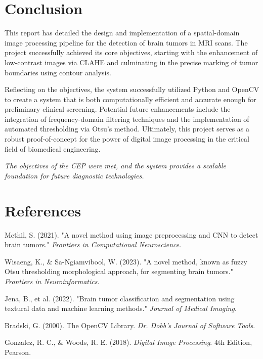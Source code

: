 \documentclass[12pt,a4paper,oneside]{report}
\begin{document}
\lipsum[5-6] %

\chapter{Conclusion}
This report has detailed the design and implementation of a spatial-domain image processing pipeline for the detection of brain tumors in MRI scans. The project successfully achieved its core objectives, starting with the enhancement of low-contrast images via CLAHE and culminating in the precise marking of tumor boundaries using contour analysis.

Reflecting on the objectives, the system successfully utilized Python and OpenCV to create a system that is both computationally efficient and accurate enough for preliminary clinical screening. Potential future enhancements include the integration of frequency-domain filtering techniques and the implementation of automated thresholding via Otsu's method. Ultimately, this project serves as a robust proof-of-concept for the power of digital image processing in the critical field of biomedical engineering.

\vfill
\textit{The objectives of the CEP were met, and the system provides a scalable foundation for future diagnostic technologies.}

\chapter{References}
\begin{enumerate}[label={[\arabic*]}]
    \item Methil, S. (2021). "A novel method using image preprocessing and CNN to detect brain tumors." \textit{Frontiers in Computational Neuroscience}.
    \item Wisaeng, K., \& Sa-Ngiamvibool, W. (2023). "A novel method, known as fuzzy Otsu thresholding morphological approach, for segmenting brain tumors." \textit{Frontiers in Neuroinformatics}.
    \item Jena, B., et al. (2022). "Brain tumor classification and segmentation using textural data and machine learning methods." \textit{Journal of Medical Imaging}.
    \item Bradski, G. (2000). The OpenCV Library. \textit{Dr. Dobb's Journal of Software Tools}.
    \item Gonzalez, R. C., & Woods, R. E. (2018). \textit{Digital Image Processing}. 4th Edition, Pearson.
\end{enumerate}
\end{document}
